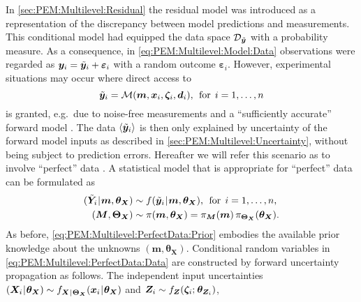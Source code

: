 In \cref{sec:PEM:Multilevel:Residual} the residual model was introduced as a representation of the discrepancy between model predictions and measurements.
This conditional model had equipped the data space \(\mathcal{D}_{\tilde{\bm{y}}}\) with a probability measure.
As a consequence, in \cref{eq:PEM:Multilevel:Model:Data} observations were regarded as \(\bm{y}_i = \tilde{\bm{y}}_i + \bm{\varepsilon}_i\) with a random outcome \(\bm{\varepsilon}_i\).
However, experimental situations may occur where direct access to
\begin{equation} \label{eq:PEM:Multilevel:PerfectData:StatisticalDataModel}
  \tilde{\bm{y}}_i = \mathcal{M}(\bm{m},\bm{x}_i,\bm{\zeta}_i,\bm{d}_i), \;\, \text{for} \;\, i=1,\ldots,n
\end{equation}
is granted, e.g.\ due to noise-free measurements and a ``sufficiently accurate'' forward model \cite{NASA:Crespo2014:Proc}.
The data \(\langle{\tilde{\bm{y}}_i}\rangle\) is then only explained by uncertainty of the forward model inputs as described in \cref{sec:PEM:Multilevel:Uncertainty}, without being subject to prediction errors.
Hereafter we will refer this scenario as to involve ``perfect'' data \cite{Nagel:SciTech2014:Proc,Nagel:JAIS2015}.
A statistical model that is appropriate for ``perfect'' data can be formulated as
\begin{subequations} \label{eq:PEM:Multilevel:PerfectData:Model}
  \begin{align}
    (\tilde{\bm{Y}}_i {\:\!}|{\:\!} \bm{m},\bm{\theta}_{\bm{X}}) &\sim f (\tilde{\bm{y}}_i {\:\!}|{\:\!} \bm{m},\bm{\theta}_{\bm{X}}), \;\, \text{for} \;\, i=1,\ldots,n, \label{eq:PEM:Multilevel:PerfectData:Data}\\
    (\bm{M},\bm{\Theta}_{\bm{X}}) &\sim \pi(\bm{m},\bm{\theta}_{\bm{X}}) = \pi_{\bm{M}} (\bm{m}) \, \pi_{\bm{\Theta}_{\bm{X}}}(\bm{\theta}_{\bm{X}}). \label{eq:PEM:Multilevel:PerfectData:Prior}
  \end{align}
\end{subequations}
As before, \cref{eq:PEM:Multilevel:PerfectData:Prior} embodies the available prior knowledge about the unknowns \((\bm{m},\bm{\theta}_{\bm{X}})\).
Conditional random variables in \cref{eq:PEM:Multilevel:PerfectData:Data} are constructed by forward uncertainty propagation as follows.
The independent input uncertainties \((\bm{X}_i {\:\!}|{\:\!} \bm{\theta}_{\bm{X}}) \sim f_{\bm{X} {\:\!}|{\:\!} \bm{\Theta}_{\bm{X}}} (\bm{x}_i {\:\!}|{\:\!} \bm{\theta}_{\bm{X}})\) and \(\bm{Z}_i \sim f_{\bm{Z}}(\bm{\zeta}_i ;{\:\!} \bm{\theta}_{\bm{Z}_i})\),
